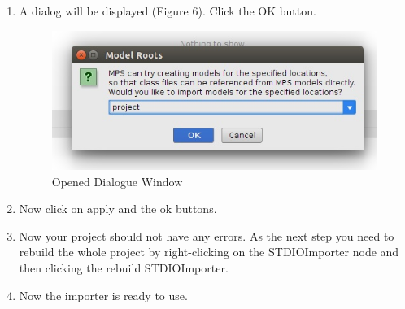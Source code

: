 \documentclass{article}
\begin{document}
\begin{itemize}
\begin{enumerate}
\item
A dialog will be displayed (Figure 6). Click the OK button.
\begin{figure}[h]
\caption{Opened Dialogue Window}
\centering
\includegraphics[scale=0.5]{dialog.jpg}
\end{figure}
\item
Now click on apply and the ok buttons.
\item
Now your project should not have any errors.  As the next step you need to rebuild the whole project by right-clicking on the STDIOImporter node and then clicking the rebuild STDIOImporter.
\item
Now the importer is ready to use.
\end{enumerate}
\end{itemize}
\end{document}
